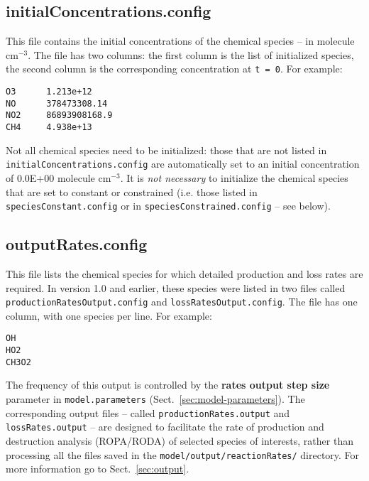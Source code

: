 \subsection{initialConcentrations.config} \label{subsec:initialconcentrations}

This file contains the initial concentrations of the chemical species
-- in molecule cm$^{-3}$. The file has two columns: the first column
is the list of initialized species, the second column is the
corresponding concentration at \texttt{t\ =\ 0}. For example:

\begin{verbatim}
O3      1.213e+12
NO      378473308.14
NO2     86893908168.9
CH4     4.938e+13
\end{verbatim}

Not all chemical species need to be initialized: those that are not
listed in \texttt{initialConcentrations.config} are automatically set
to an initial concentration of 0.0E+00 molecule cm$^{-3}$. It is
\emph{not necessary} to initialize the chemical species that are set
to constant or constrained (i.e. those listed in
\texttt{speciesConstant.config} or in \texttt{speciesConstrained.config}
-- see below).

\subsection{outputRates.config} \label{subsec:outputrates}

This file lists the chemical species for which detailed production and
loss rates are required. In version 1.0 and earlier, these species
were listed in two files called \texttt{productionRatesOutput.config}
and \texttt{lossRatesOutput.config}. The file has one column, with one
species per line. For example:

\begin{verbatim}
OH
HO2
CH3O2
\end{verbatim}

The frequency of this output is controlled by the \textbf{rates output
  step size} parameter in \texttt{model.parameters}
(Sect.~\ref{sec:model-parameters}). The corresponding output files --
called \texttt{productionRates.output} and \texttt{lossRates.output}
-- are designed to facilitate the rate of production and destruction
analysis (ROPA/RODA) of selected species of interests, rather than
processing all the files saved in the \texttt{model/output/reactionRates/}
directory. For more information go to Sect.~\ref{sec:output}.

